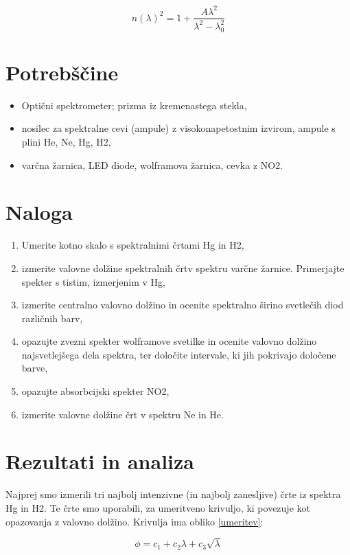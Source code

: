 \documentclass[12pt]{article}
\begin{document}
\begin{equation}
    n(\lambda)^2 = 1 + \frac{A\lambda ^2}{\lambda ^2-\lambda_0^2}
    \label{Seill}
\end{equation}

\section{Potrebščine}
\begin{itemize}
    \item Optični spektrometer; prizma iz kremenastega stekla,
    \item nosilec za spektralne cevi (ampule) z visokonapetostnim izvirom, ampule s plini He, Ne, Hg, H2,
    \item varčna žarnica, LED diode, wolframova žarnica, cevka z NO2.
\end{itemize}

\section{Naloga}

\begin{enumerate}
    \item Umerite kotno skalo s spektralnimi črtami Hg in H2,
    \item izmerite valovne dolžine spektralnih črtv spektru varčne žarnice. Primerjajte spekter s tistim, izmerjenim v Hg,
    \item izmerite centralno valovno dolžino in ocenite spektralno širino svetlečih diod različnih barv,
    \item opazujte zvezni spekter wolframove svetilke in ocenite valovno dolžino najsvetlejšega dela spektra, ter določite intervale, ki jih pokrivajo določene barve,
    \item opazujte absorbcijski spekter NO2,
    \item izmerite valovne dolžine črt v spektru Ne in He.
\end{enumerate}


\section{Rezultati in analiza}
Najprej smo izmerili tri najbolj intenzivne (in najbolj zanesljive) črte iz spektra Hg in H2. Te črte smo uporabili, za umeritveno krivuljo, ki povezuje kot opazovanja z valovno dolžino. Krivulja ima obliko \ref{umeritev}:

\begin{equation}
    \phi = c_1 + c_2\lambda + c_3\sqrt{\lambda}
    \label{umeritev}
\end{equation}
\end{document}
